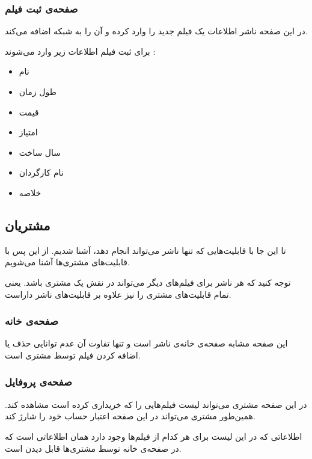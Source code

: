 \documentclass{utap}
\begin{document}
		
		 \subsubsection{صفحه‌ی ثبت فیلم}
	در این صفحه ناشر اطلاعات یک فیلم جدید را وارد کرده و آن را به شبکه اضافه می‌کند. 
	
	برای ثبت فیلم اطلاعات زیر وارد می‌شوند :
		\begin{multicols}{3}
		\begin{itemize}
			\item نام 
			\item طول زمان  
			\item قیمت 
			\item امتیاز 
			\item سال ساخت
			\item نام کارگردان
			\item خلاصه‌
		\end{itemize}
		\end{multicols}
		
	
	\subsection{مشتریان}
	تا این جا با قابلیت‌هایی که تنها ناشر می‌تواند انجام دهد، آشنا شدیم.
	از این پس با قابلیت‌های مشتری‌ها آشنا می‌شویم.
	
	توجه کنید که هر ناشر برای فیلم‌های دیگر می‌تواند در نقش یک مشتری باشد.
	یعنی تمام قابلیت‌های مشتری را نیز علاوه بر قابلیت‌های ناشر داراست.
	
	
	
		\subsubsection{صفحه‌ی خانه}
	
	این صفحه مشابه صفحه‌ی خانه‌ی ناشر است و تنها تفاوت آن عدم توانایی حذف یا اضافه کردن فیلم توسط مشتری است. 
	
		\subsubsection{صفحه‌ی پروفایل}

		در این صفحه مشتری می‌تواند لیست فیلم‌هایی را که خریداری کرده است مشاهده کند. همین‌طور مشتری می‌تواند در این صفحه اعتبار حساب خود را شارژ کند. 
		
		اطلاعاتی که در این لیست برای هر کدام از فیلم‌ها وجود دارد همان اطلاعاتی‌ است که در صفحه‌ی خانه توسط مشتری‌ها قابل دیدن است.
\end{document}
